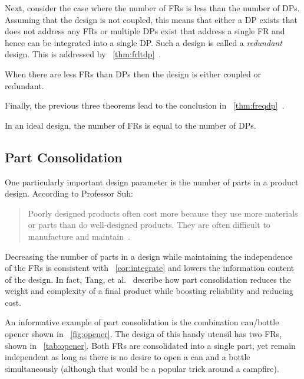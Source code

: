 Next, consider the case where the number of FRs is less than the number of DPs.  Assuming that the design is not
coupled, this means that either a DP exists that does not address any FRs or multiple DPs exist that address a
single FR and hence can be integrated into a single DP.  Such a design is called a \emph{redundant} design.  This
is addressed by \theoremname~\ref{thm:frltdp}~\cite{suh}.

\begin{theorem}
  \label{thm:frltdp}
  When there are less FRs than DPs then the design is either coupled or redundant.
\end{theorem}

Finally, the previous three theorems lead to the conclusion in \theoremname~\ref{thm:freqdp}~\cite{suh}.

\begin{theorem}
  \label{thm:freqdp}
  In an ideal design, the number of FRs is equal to the number of DPs.
\end{theorem}

\subsection{Part Consolidation}\label{sec:sub:parts}

One particularly important design parameter is the number of parts in a product design.  According to Professor
Suh:
\begin{quote}
  \vspace{-\baselineskip}
  Poorly designed products often cost more because they use more materials or parts than do well-designed products.
  They are often difficult to manufacture and maintain~\cite{suh}.
\end{quote}
Decreasing the number of parts in a design while maintaining the independence of the FRs is consistent with
\corollaryname~\ref{cor:integrate} and lowers the information content of the design.  In fact, Tang, et
al.~\cite{tang} describe how part consolidation reduces the weight and complexity of a final product while boosting
reliability and reducing cost.

An informative example of part consolidation is the combination can/bottle opener shown in
\figurename~\ref{fig:opener}.  The design of this handy utensil has two FRs, shown in \tablename~\ref{tab:opener}.
Both FRs are consolidated into a single part, yet remain independent as long as there is no desire to open a can
and a bottle simultaneously (although that would be a popular trick around a campfire).

